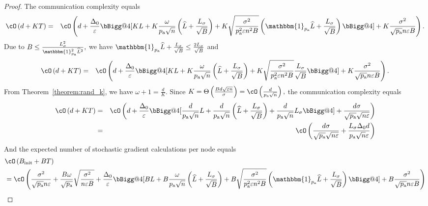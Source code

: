 \documentclass{article}
\makeatletter
\newcommand*{\probavailable}{\ensuremath{p_{\textnormal{a}}}}
\newcommand{\vast}{\bBigg@{4}}
\makeatother
\begin{document}
\begin{proof}
  The communication complexity equals
  \begin{eqnarray*}
      \cO\left(d + K T\right) &=& \cO\left(d + \frac{\Delta_0}{\varepsilon}\vast[K L + K\frac{\omega}{\probavailable \sqrt{n}} \left(\widehat{L} + \frac{L_{\sigma}}{\sqrt{B}}\right) + K \sqrt{\frac{\sigma^2}{\probavailable^2 \varepsilon n^2 B}}\left(\mathbbm{1}_{\probavailable}\widehat{L} + \frac{L_{\sigma}}{\sqrt{B}}\right)\vast] + K\frac{\sigma^2}{\sqrt{\probavailable} n \varepsilon B}\right).
  \end{eqnarray*}
  Due to $B \leq \frac{L_{\sigma}^2}{\mathbbm{1}_{\probavailable}^2\widehat{L}^2}, $ we have $\mathbbm{1}_{\probavailable}\widehat{L} + \frac{L_{\sigma}}{\sqrt{B}} \leq \frac{2L_{\sigma}}{\sqrt{B}}$ and
  \begin{eqnarray*}
    \cO\left(d + K T\right) &=& \cO\left(d + \frac{\Delta_0}{\varepsilon}\vast[K L + K\frac{\omega}{\probavailable \sqrt{n}} \left(\widehat{L} + \frac{L_{\sigma}}{\sqrt{B}}\right) + K \sqrt{\frac{\sigma^2}{\probavailable^2 \varepsilon n^2 B}}\frac{L_{\sigma}}{\sqrt{B}}\vast] + K\frac{\sigma^2}{\sqrt{\probavailable} n \varepsilon B}\right).
\end{eqnarray*}
  From Theorem~\ref{theorem:rand_k}, we have $\omega + 1 = \frac{d}{K}.$ Since $K = \Theta\left(\frac{B d \sqrt{\varepsilon n}}{\sigma}\right) = \cO\left(\frac{d}{\probavailable\sqrt{n}}\right),$ the communication complexity equals
  \begin{eqnarray*}
      \cO\left(d + K T\right) &=& \cO\left(d + \frac{\Delta_0}{\varepsilon}\vast[\frac{d}{\probavailable\sqrt{n}}L + \frac{d}{\probavailable \sqrt{n}} \left(\widehat{L} + \frac{L_{\sigma}}{\sqrt{B}}\right) + \frac{d}{\probavailable \sqrt{n}} L_{\sigma}\vast] + \frac{d \sigma}{\sqrt{\probavailable} \sqrt{n \varepsilon}}\right) \\
      &=& \cO\left(\frac{d \sigma}{\sqrt{\probavailable} \sqrt{n \varepsilon}} + \frac{L_{\sigma} \Delta_0 d}{\probavailable \sqrt{n} \varepsilon}\right) \\
  \end{eqnarray*}
  And the expected number of stochastic gradient calculations per node equals
  \begin{align*}
      &\cO\left(B_{\textnormal{init}} + B T\right) \\
      &= \cO\left(\frac{\sigma^2}{\sqrt{\probavailable} n \varepsilon} +  \frac{B \omega}{\sqrt{\probavailable}} \sqrt{\frac{\sigma^2}{n \varepsilon B}} + \frac{\Delta_0}{\varepsilon}\vast[B L + B\frac{\omega}{\probavailable \sqrt{n}} \left(\widehat{L} + \frac{L_{\sigma}}{\sqrt{B}}\right) + B \sqrt{\frac{\sigma^2}{\probavailable^2 \varepsilon n^2 B}}\left(\mathbbm{1}_{\probavailable}\widehat{L} + \frac{L_{\sigma}}{\sqrt{B}}\right)\vast] + B\frac{\sigma^2}{\sqrt{\probavailable} n \varepsilon B}\right) \\

\end{align*}
\end{proof}
\end{document}
